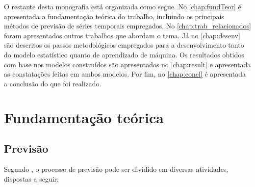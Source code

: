 \documentclass[
    12pt,
    oneside,
    a4paper,
    english,
    brazil
]{abntex2}
\begin{document}


O    restante   desta    monografia    está   organizada    como   segue.    No
\autoref{chap:fundTeor}  é apresentada  a  fundamentação  teórica do  trabalho,
incluindo os  principais métodos  de previsão  de séries  temporais empregados.
No  \autoref{chap:trab_relacionados} foram  apresentados  outros trabalhos  que
abordam  o   tema.  Já  no   \autoref{chap:desenv}  são  descritos   os  passos
metodológicos  empregados para  a desenvolvimento  tanto do  modelo estatístico
quanto  de  aprendizado  de  máquina.   Os  resultados  obtidos  com  base  nos
modelos construídos são apresentados  no \autoref{chap:result} e apresentada as
constatações  feitas  em ambos  modelos.  Por  fim, no  \autoref{chap:concl}  é
apresentada a conclusão do que foi realizado.

\chapter{Fundamentação teórica}\label{chap:fundTeor}

\section{Previsão}
Segundo  ,  o  processo  de previsão  pode  ser  dividido  em
diversas atividades, dispostas a seguir:
\end{document}
